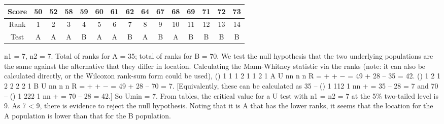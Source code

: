 \documentclass[a4paper,12pt]{article}
\begin{document}
\begin{enumerate}[(a)]
\begin{center}
\begin{tabular}{|c|c|c |c|c|c |c|c|c |c|c|c |c|c|c |}
 Score & 50 & 52 & 58&  59&  60&  61 & 62 & 64 & 67&  68&  69&  71& 72& 73 \\ \hline 
 Rank&  1 & 2& 3 & 4&  5 &  6&  7&  8&  9&  10&  11& 12 & 13 & 14 \\ \hline 
 Test & A & A & A & B & A&  A & B & A & B& A& B& B& B & B \\ \hline 
\end{tabular}
\end{center}
 n1 = 7, n2 = 7.    Total of ranks for A = 35;  total of ranks for B = 70. 
 We test the null hypothesis that the two underlying populations are the same against the alternative that they differ in location. 
 Calculating the Mann-Whitney statistic via the ranks (note:  it can also be calculated directly, or the Wilcoxon rank-sum form could be used), 
  () 1 1 1 2 1 1 2 1 A U nn n n R = + + − = 49 + 28 – 35 = 42.   () 1 2 1 2 2 2 2 1 B U nn n n R = + + − = 49 + 28 – 70 = 7. 
 [Equivalently, these can be calculated as 35 – () 1 112 1 nn + = 35 – 28 = 7 and 70 – () 1 222 1 nn + = 70 – 28 = 42.] 
 So Umin = 7.  From tables, the critical value for a U test with n1 = n2 = 7 at the 5\% two-tailed level is 9.  As 7 < 9, there is evidence to reject the null hypothesis.  Noting that it is A that has the lower ranks, it seems that the location for the A population is lower than that for the B population. 
 \end{enumerate}
 
\end{document}
